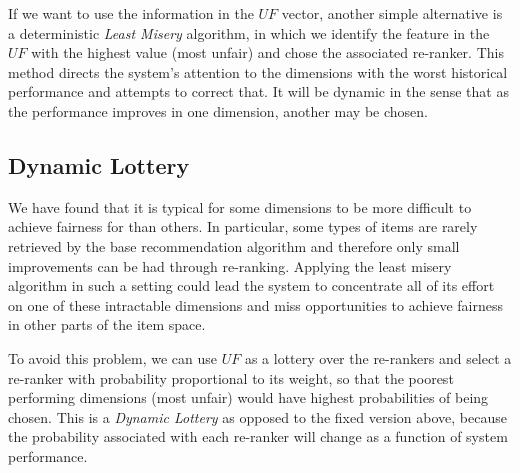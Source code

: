 If we want to use the information in the $UF$ vector, another simple alternative is a deterministic \textit{Least Misery} algorithm, in which we identify the feature in the $UF$ with the highest value (most unfair) and chose the associated re-ranker. This method directs the system's attention to the dimensions with the worst historical performance and attempts to correct that. It will be dynamic in the sense that as the performance improves in one dimension, another may be chosen. 

\subsection{Dynamic Lottery}
We have found that it is typical for some dimensions to be more difficult to achieve fairness for than others. In particular, some types of items are rarely retrieved by the base recommendation algorithm and therefore only small improvements can be had through re-ranking. Applying the least misery algorithm in such a setting could lead the system to concentrate all of its effort on one of these intractable dimensions and miss opportunities to achieve fairness in other parts of the item space. 

To avoid this problem, we can use $UF$ as a lottery over the re-rankers and select a re-ranker with probability proportional to its weight, so that the poorest performing dimensions (most unfair) would have highest probabilities of being chosen. This is a \textit{Dynamic Lottery} as opposed to the fixed version above, because the probability associated with each re-ranker will change as a function of system performance. 


